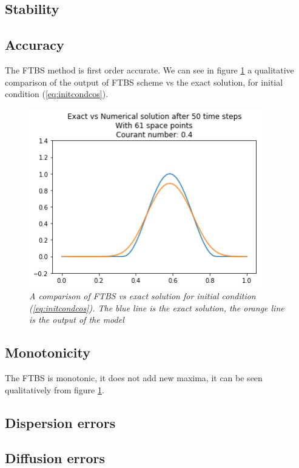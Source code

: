 \subsection{Stability} \label{stabilityftbs}

\subsection{Accuracy}
The FTBS method is first order accurate. We can see in figure \ref{fig:ftbsvsexact} a qualitative comparison of the output of FTBS scheme vs the exact solution, for initial condition (\ref{eq:initcondcos}).
\begin{figure}[H]
	\begin{center}
		\includegraphics[width=4in]{graphics/FTBS_vs_exact.png}
	\end{center}%
	\caption[A comparison of FTBS vs exact solution.]{ \em A comparison of FTBS vs exact solution for initial condition (\ref{eq:initcondcos}). The blue line is the exact solution, the orange line is the output of the model}
	\label{fig:ftbsvsexact}
\end{figure}

\subsection{Monotonicity}
The FTBS is monotonic, it does not add new maxima, it can be seen qualitatively from figure \ref{fig:ftbsvsexact}.

\subsection{Dispersion errors}

\subsection{Diffusion errors}

